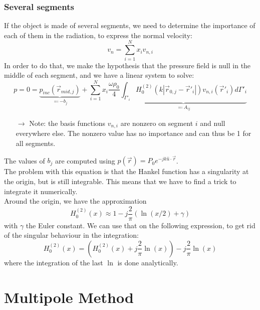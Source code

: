 \documentclass[12pt, openany]{report}
\theoremstyle{definition}
\begin{document}
\subsection{Several segments}\label{sec:sev_seg}
If the object is made of several segments, we need to determine the importance of each of them in the radiation, to express the normal velocity:
\begin{equation}
	v_n = \sum_{i=1}^N x_i v_{n,i}
\end{equation}
In order to do that, we make the hypothesis that the pressure field is null in the middle of each segment, and we have a linear system to solve:
\begin{equation}
	p = 0 = \underbrace{p_ {inc}(\vec r_{mid, j})}_{\eqqcolon -b_j} + \sum_{i=1}^N x_i \frac{\omega \rho_0}{4} \underbrace{\int_{\Gamma'_i}  H_0^{(2)} (k|\vec r_{0,j}-\vec r'_i|) v_{n,i}(\vec r'_i) d\Gamma'_i}_{\eqqcolon A_{ij}}
\end{equation}
\begin{itemize}
	\item [$\to$] Note: the basis functions $v_{n,i}$ are nonzero on segment $i$ and null everywhere else. The nonzero value has no importance and can thus be 1 for all segments. 
\end{itemize}
The values of $b_j$ are computed using $p(\vec r) = P_0 e^{-jk \hat u\cdot \vec r}$. \\
The problem with this equation is that the Hankel function has a singularity at the origin, but is still integrable. This means that we have to find a trick to integrate it numerically. \\
Around the origin, we have the approximation
\begin{equation}
	H_0^{(2)}(x) \approx 1-j\frac{2}{\pi}(\ln(x/2)+\gamma)
\end{equation}
with $\gamma$ the Euler constant. We can use that on the following expression, to get rid of the singular behaviour in the integration: 
\begin{equation}
	H_0^{(2)}(x) = \left(H_0^{(2)}(x) + j\frac{2}{\pi}\ln(x)\right) - j\frac{2}{\pi} \ln(x)
\end{equation}
where the integration of the last $\ln$ is done analytically. 
\chapter{Multipole Method}
\end{document}

